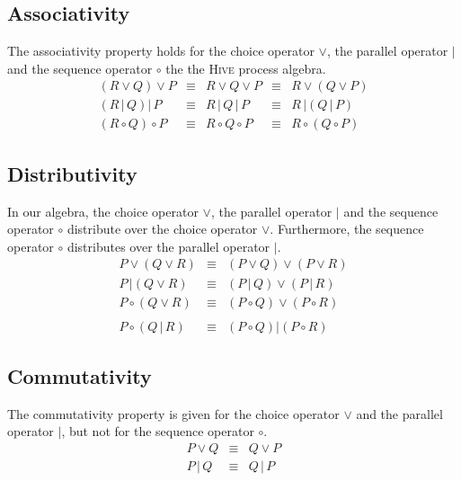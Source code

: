 \subsection{Associativity}
The associativity property holds for the choice operator $\vee$, the parallel operator $|$ and the sequence operator $\circ$ the the \textsc{Hive} process algebra.
\begin{equation*}
\begin{array}{rcccl}
  \left( R \vee Q \right) \vee P & \equiv & R \vee Q \vee P & \equiv & R \vee \left( Q \vee P \right) \\
  \left( R \,|\, Q \right) |\, P & \equiv & R \,|\, Q \,|\, P & \equiv & R \,| \left( Q \,|\, P \right) \\
  \left( R \circ Q \right) \circ P & \equiv & R \circ Q \circ P & \equiv & R \circ \left( Q \circ P \right)
\end{array}
\end{equation*}

\subsection{Distributivity}
In our algebra, the choice operator $\vee$, the parallel operator $|$ and the sequence operator $\circ$ distribute over the choice operator $\vee$. Furthermore, the sequence operator $\circ$ distributes over the parallel operator $|$.
\begin{eqnarray*}
  P \vee \left( Q \vee R \right) & \equiv & \left( P \vee Q \right) \vee \left( P \vee R \right) \\
  P \,| \left( Q \vee R \right) & \equiv & \left( P \,|\, Q \right) \vee \left( P \,|\, R \right) \\
  P \circ \left( Q \vee R \right) & \equiv & \left( P \circ Q \right) \vee \left( P \circ R \right) \\
  & & \\
  P \circ \left( Q \,|\, R \right) & \equiv & \left( P \circ Q \right) | \left( P \circ R \right)
\end{eqnarray*}

\subsection{Commutativity}
The commutativity property is given for the choice operator $\vee$ and the parallel operator $|$, but not for the sequence operator $\circ$.
\begin{eqnarray*}
  P \vee Q & \equiv & Q \vee P \\
  P \,|\, Q & \equiv & Q \,|\, P
\end{eqnarray*}

